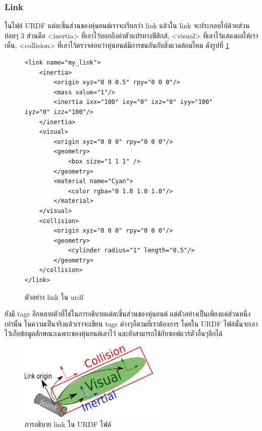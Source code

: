 \subsubsection*{Link}
ในไฟล์ URDF แต่ละชิ้นส่วนของหุ่นยนต์เราจะเรียกว่า link แล้วใน link จะประกอบไปด้วยส่วนย่อยๆ
3 ส่วนคือ <inertia> ที่เอาไว้บอกถึงค่าตัวแปรทางฟิสิกส์, <visual> ที่เอาไว้แสดงผลให้เราเห็น, 
<collision> ที่เอาไว้ตรวจสอบว่าหุ่นยนต์มีการชนกันกับสิ่งแวดล้อมไหม ดังรูปที่ \ref{fig:urdf_link_code}

\clearpage
\begin{figure}[!ht]
\begin{Verbatim}[fontsize=\small]
<link name="my_link">
    <inertia>
        <origin xyz="0 0 0.5" rpy="0 0 0"/>
        <mass value="1"/>
        <inertia ixx="100" ixy="0" ixz="0" iyy="100" iyz="0" izz="100"/>
    </inertia>
    <visual>
        <origin xyz="0 0 0" rpy="0 0 0"/>
        <geometry>
            <box size="1 1 1" />
        </geometry>
        <material name="Cyan">
            <color rgba="0 1.0 1.0 1.0"/>
        </material>
    </visual>
    <collision>
        <origin xyz="0 0 0" rpy="0 0 0"/>
        <geometry>
            <cylinder radius="1" length="0.5"/>
        </geometry>
    </collision>
</link>
\end{Verbatim}
\caption{ตัวอย่าง link ใน urdf}
\label{fig:urdf_link_code}
\end{figure}

ยังมี tags อีกหลายตัวที่ใช่ในการอธิบายแต่ละชิ้นส่วนของหุ่นยนต์ แต่ตัวอย่างเป็นเพียงแค่ส่วนหนึ่งเท่านั้น
ในความเป็นจริงแล้วเราจะเขียน tags ต่างๆก็ตามที่เราต้องการ โดยใน URDF ไฟล์นั้นจะเอาไว้เก็บข้อมูลลักษณะเฉพาะของหุ่นยนต์เอาไว้
และยังสามารถใช้กับซอฟแวร์ตัวอื่นๆอีกได้
\begin{figure}[!ht]
	\centering
	\includegraphics[width=0.60\textwidth]{chapter3/images/urdf_link.png}
	\caption{การอธิบาย link ใน URDF ไฟล์}
	\label{fig:urdf_link}
\end{figure}

\clearpage
